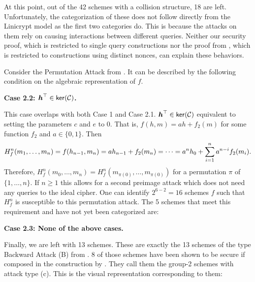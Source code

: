 At this point, out of the 42 schemes with a collision structure, 18 are left.
Unfortunately, the categorization of these does not follow directly from the Linicrypt model as the first two categories do.
This is because the attacks on them rely on causing interactions between different queries.
Neither our security proof, which is restricted to single query constructions
nor the proof from \cite[Theorem 1]{TCC:McQSwoRos19}, which is restricted to constructions using distinct nonces,
can explain these behaviors.

Consider the Permutation Attack from \cite{C:PreGovVan93}.
It can be described by the following condition on the algebraic representation of $f$.

\textbf{Case 2.2: $\boldsymbol h^\top \in \mathsf{ker}(\mathcal{C})$.}

This case overlaps with both Case 1 and Case 2.1.
$\boldsymbol h^\top \in \mathsf{ker}(\mathcal{C})$ equivalent to setting the parameters $c$ and $e$ to 0.
That is, $f(h,m) = ah + f_2(m)$ for some function $f_2$ and $a \in \{0,1\}$.
Then 
\[
H^n_f(m_1, \dots, m_{n}) = f(h_{n-1}, m_n) = a h_{n-1} + f_2(m_n) = \cdots = a^n h_{0} + \sum_{i=1}^n a^{n-i}f_2(m_i).
\]
Therefore, $H^n_f(m_0, \dots, m_n) = H^n_f(m_{\pi(0)}, \dots, m_{\pi(0)})$ for a permutation $\pi$ of $\{1, \dots, n\}$.
If $n \geq 1$ this allows for a second preimage attack which does not need any queries to the ideal cipher.
One can identify $2^{6-2} = 16$ schemes $f$ such that $H^n_f$ is susceptible to this permutation attack.
The 5 schemes that meet this requirement and have not yet been categorized are:
\begin{center}
\end{center}

\textbf{Case 2.3: None of the above cases.}

Finally, we are left with 13 schemes.
These are exactly the 13 schemes of the type Backward Attack (B) from \cite{C:PreGovVan93}.
8 of those schemes have been shown to be secure if composed in the \MD construction by \cite{C:BlaRogShr02}.
They call them the group-2 schemes with attack type (c).
This is the visual representation corresponding to them:
\begin{center}
\end{center}

